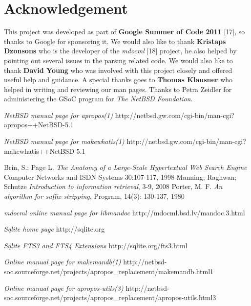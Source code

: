 \documentclass[titlepage, a4paper, 12pt]{article}
\begin{document}
\section{Acknowledgement}
This project was developed as part of \textbf{Google Summer of Code 2011} [17],
so thanks to Google for sponsoring it. We would also like to thank
\textbf{Kristaps Dzonsons} who is the developer of the \textit{mdocml} [18]
project, he also helped by pointing out several issues in the parsing related
code. We would also like to thank \textbf{David Young} who was involved with
this project closely and offered useful help and guidance. A special thanks goes
to \textbf{Thomas Klausner} who helped in writing and reviewing our man pages.
Thanks to Petra Zeidler for administering the GSoC program for \textit{The NetBSD
Foundation}.
\begin{thebibliography}{20}
\emph{NetBSD manual page for apropos(1)}
\newline http://netbsd.gw.com/cgi-bin/man-cgi?apropos++NetBSD-5.1

\emph{NetBSD manual page for makewhatis(1)}
\newline http://netbsd.gw.com/cgi-bin/man-cgi?makewhatis++NetBSD-5.1

Brin, S.; Page L.
\emph{The Anatomy of a Large-Scale Hypertextual Web Search Engine}
Computer Networks and ISDN Systems
30:107-117, 1998
Manning; Raghwan; Schutze
\emph{Introduction to information retrieval},
3-9,
2008
Porter, M. F.
\emph{An algorithm for suffix stripping},
Program,
14(3): 130-137,
1980

\emph{mdocml online manual page for
libmandoc}
\newline http://mdocml.bsd.lv/mandoc.3.html

\emph{Sqlite home page}
\newline http://sqlite.org

\emph{Sqlite FTS3 and FTS4 Extensions}
\newline  http://sqlite.org/fts3.html

\emph{Online manual page for makemandb(1)}
\newline http://netbsd-soc.sourceforge.net/projects/apropos\_replacement/makemandb.html1

\emph{Online manual page for apropos-utils(3)}
\newline http://netbsd-soc.sourceforge.net/projects/apropos\_replacement/apropos-utils.html3


\end{thebibliography}
\end{document}
